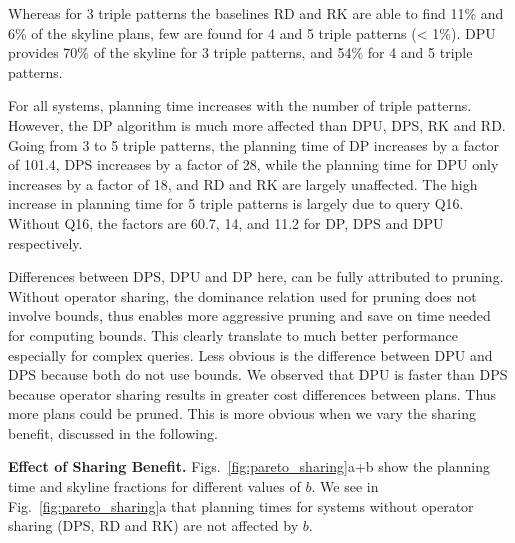 Whereas for 3 triple patterns the baselines RD and RK are able to find 11\% and 6\% of the skyline plans, few
are found for 4 and 5 triple patterns (< 1\%). DPU provides 
70\% of the skyline for 3 triple patterns, and 54\% for 4 and 5 triple patterns. 


For all systems, planning time increases with the number of triple
patterns. However, the DP algorithm is much more affected than DPU,
DPS, RK and RD. Going from 3 to 5 triple patterns, the planning time
of DP increases by a factor of 101.4, DPS increases by a factor of 28,
while the planning time for DPU only increases by a factor of 18, and
RD and RK are largely unaffected. The high increase in planning time
for 5 triple patterns is largely due to query Q16. Without Q16, the
factors are 60.7, 14, and 11.2 for DP, DPS and DPU respectively.

Differences between DPS, DPU and DP here, can be fully attributed to pruning. Without operator sharing, the dominance relation used for pruning does not involve bounds, thus enables more aggressive pruning and save on time needed for computing bounds. This clearly translate to much better performance especially for complex queries. Less obvious is the difference between DPU and DPS because both do not use bounds. We observed that DPU is faster than DPS because operator sharing results in greater cost differences between plans. Thus more plans could be pruned. This is more obvious when we vary the sharing benefit, discussed in the following.  




\textbf{Effect of Sharing Benefit.} Figs.~\ref{fig:pareto_sharing}a+b
show the planning time and skyline fractions for different values of $b$. We see in Fig.~\ref{fig:pareto_sharing}a that planning times for systems without operator sharing (DPS, RD and RK) are not affected by $b$. 

